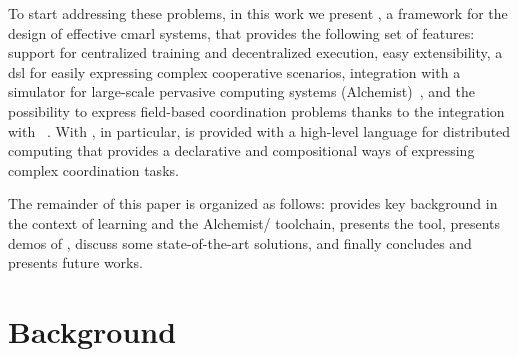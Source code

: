 To start addressing these problems, in this work we present \scarlib{}, a framework for the design of effective \ac{cmarl} systems, that 
 provides the following set of features:
 support for centralized training and decentralized execution, 
 easy extensibility, 
 a \ac{dsl} for easily expressing complex cooperative scenarios, 
 integration with a simulator for large-scale pervasive computing systems (Alchemist)~\cite{DBLP:journals/jos/PianiniMV13},
 and the possibility to express field-based coordination problems thanks to the integration with \scafi{}~\cite{Casadei2022}.
%
With \scafi{}, in particular, \scarlib{} is provided with a high-level language for distributed computing that provides a declarative
 and compositional ways of expressing complex coordination tasks. 

The remainder of this paper is organized as follows:  provides key background in the context of learning and the Alchemist/\scafi{} toolchain,  presents the \scarlib{} tool,  presents demos of \scarlib{},  discuss some state-of-the-art solutions, and finally  concludes and presents future works.
%
\section{Background}\label{coordination2023:background} %

